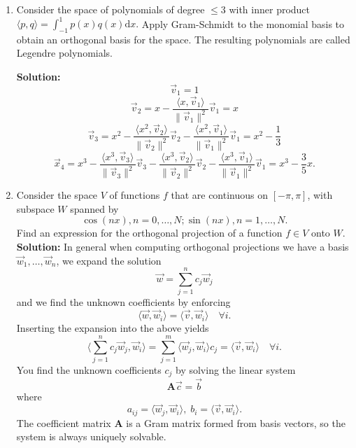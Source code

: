 \documentclass[11pt,fleqn]{article}
\begin{document}
\begin{enumerate}
\item Consider the space of polynomials of degree $\le 3$ with inner product $\langle p,q\rangle = \int_{-1}^1p(x)q(x)\mathrm{d}x.$ Apply Gram-Schmidt to the monomial basis to obtain an orthogonal basis for the space. The resulting polynomials are called Legendre polynomials.

{\bf Solution:} 
\[\vec{v}_1 = 1\]
\[\vec{v}_2 = x - \frac{\langle x,\vec{v}_1\rangle}{\|\vec{v}_1\|^2}\vec{v}_1 = x\]
\[\vec{v}_3 = x^2 -\frac{\langle x^2,\vec{v}_2\rangle}{\|\vec{v}_2\|^2}\vec{v}_2- \frac{\langle x^2,\vec{v}_1\rangle}{\|\vec{v}_1\|^2}\vec{v}_1 = x^2 - \frac{1}{3}\]
\[\vec{x}_4 = x^3 - \frac{\langle x^3,\vec{v}_3\rangle}{\|\vec{v}_3\|^2}\vec{v}_3- \frac{\langle x^3,\vec{v}_2\rangle}{\|\vec{v}_2\|^2}\vec{v}_2- \frac{\langle x^3,\vec{v}_1\rangle}{\|\vec{v}_1\|^2}\vec{v}_1 = x^3 - \frac{3}{5}x.\]
\item Consider the space $V$ of functions $f$ that are continuous on $[-\pi,\pi]$, with subspace $W$ spanned by
\[\cos(nx),n=0,\ldots,N;\sin(nx),n=1,\ldots,N.\]
Find an expression for the orthogonal projection of a function $f\in V$ onto $W$.\\

{\bf Solution:} In general when computing orthogonal projections we have a basis $\vec{w}_1,\ldots,\vec{w}_n$, we expand the solution 
\[\vec{w} = \sum_{j=1}^n c_j\vec{w}_j\]
and we find the unknown coefficients by enforcing
\[\langle\vec{w},\vec{w}_i\rangle = \langle\vec{v},\vec{w}_i\rangle\quad\forall i.\]
Inserting the expansion into the above yields
\[\langle\sum_{j=1}^nc_j\vec{w}_j,\vec{w}_i\rangle = \sum_{j=1}^m\langle\vec{w}_j,\vec{w}_i\rangle c_j = \langle\vec{v},\vec{w}_i\rangle\quad\forall i.\]
You find the unknown coefficients $c_j$ by solving the linear system
\[\mathbf{A}\vec{c} = \vec{b}\]
where
\[a_{ij} = \langle\vec{w}_j,\vec{w}_i\rangle,\;b_i = \langle\vec{v},\vec{w}_i\rangle.\]
The coefficient matrix {\bf A} is a Gram matrix formed from basis vectors, so the system is always uniquely solvable.\\


\end{enumerate}
\end{document}
